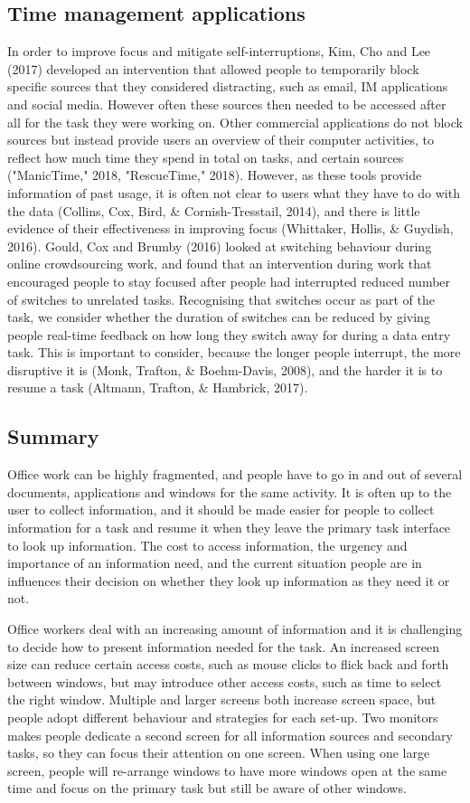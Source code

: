 \subsection{Time management applications}
In order to improve focus and mitigate self-interruptions, Kim, Cho and Lee (2017) developed an intervention that allowed people to temporarily block specific sources that they considered distracting, such as email, IM applications and social media. However often these sources then needed to be accessed after all for the task they were working on. Other commercial applications do not block sources but instead provide users an overview of their computer activities, to reflect how much time they spend in total on tasks, and certain sources ("ManicTime," 2018, "RescueTime," 2018). However, as these tools provide information of past usage, it is often not clear to users what they have to do with the data (Collins, Cox, Bird, \& Cornish-Tresstail, 2014), and there is little evidence of their effectiveness in improving focus (Whittaker, Hollis, \& Guydish, 2016). Gould, Cox and Brumby (2016) looked at switching behaviour during online crowdsourcing work, and found that an intervention during work that encouraged people to stay focused after people had interrupted reduced number of switches to unrelated tasks. Recognising that switches occur as part of the task, we consider whether the duration of switches can be reduced by giving people real-time feedback on how long they switch away for during a data entry task. This is important to consider, because the longer people interrupt, the more disruptive it is (Monk, Trafton, \& Boehm-Davis, 2008), and the harder it is to resume a task (Altmann, Trafton, \& Hambrick, 2017).

\subsection{Summary}
Office work can be highly fragmented, and people have to go in and out of several documents, applications and windows for the same activity. It is often up to the user to collect information, and it should be made easier for people to collect information for a task and resume it when they leave the primary task interface to look up information. The cost to access information, the urgency and importance of an information need, and the current situation people are in influences their decision on whether they look up information as they need it or not. 

Office workers deal with an increasing amount of information and it is challenging to decide how to present information needed for the task. An increased screen size can reduce certain access costs, such as mouse clicks to flick back and forth between windows, but may introduce other access costs, such as time to select the right window. 
Multiple and larger screens both increase screen space, but people adopt different behaviour and strategies for each set-up. Two monitors makes people dedicate a second screen for all information sources and secondary tasks, so they can focus their attention on one screen. When using one large screen, people will re-arrange windows to have more windows open at the same time and focus on the primary task but still be aware of other windows. 

